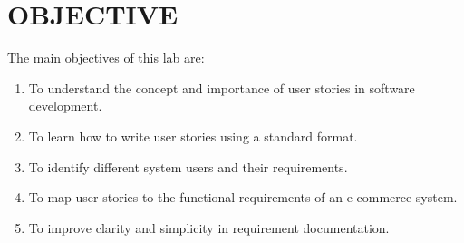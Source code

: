 \chapter{OBJECTIVE}\label{obj}


The main objectives of this lab are:
\begin{enumerate}
    \item To understand the concept and importance of user stories in software development.
    \item To learn how to write user stories using a standard format.
    \item To identify different system users and their requirements.
    \item To map user stories to the functional requirements of an e-commerce system.
    \item To improve clarity and simplicity in requirement documentation.
\end{enumerate}
\clearpage
















